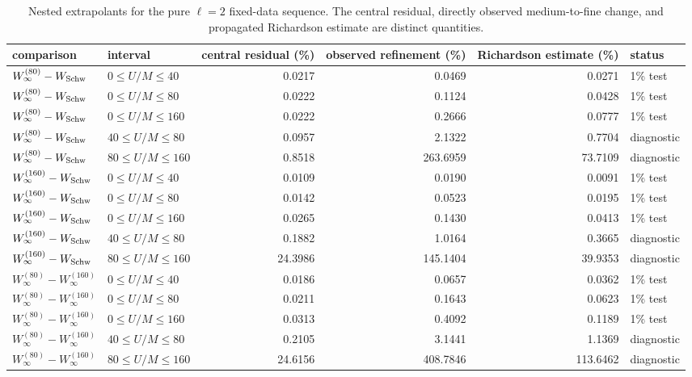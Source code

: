 \begin{table}
\centering
\small
\caption{Nested extrapolants for the pure $\ell=2$ fixed-data sequence. The central residual, directly observed medium-to-fine change, and propagated Richardson estimate are distinct quantities.}
\label{tab:flat-extrapolants}
\begin{tabular}{llrrrl}
\toprule
comparison & interval & central residual (\%) & observed refinement (\%) & Richardson estimate (\%) & status \\
\midrule
$W_\infty^{(80)}-W_{\rm Schw}$ & $0\leq U/M\leq 40$ & 0.0217 & 0.0469 & 0.0271 & 1\% test \\
$W_\infty^{(80)}-W_{\rm Schw}$ & $0\leq U/M\leq 80$ & 0.0222 & 0.1124 & 0.0428 & 1\% test \\
$W_\infty^{(80)}-W_{\rm Schw}$ & $0\leq U/M\leq 160$ & 0.0222 & 0.2666 & 0.0777 & 1\% test \\
$W_\infty^{(80)}-W_{\rm Schw}$ & $40\leq U/M\leq 80$ & 0.0957 & 2.1322 & 0.7704 & diagnostic \\
$W_\infty^{(80)}-W_{\rm Schw}$ & $80\leq U/M\leq 160$ & 0.8518 & 263.6959 & 73.7109 & diagnostic \\
$W_\infty^{(160)}-W_{\rm Schw}$ & $0\leq U/M\leq 40$ & 0.0109 & 0.0190 & 0.0091 & 1\% test \\
$W_\infty^{(160)}-W_{\rm Schw}$ & $0\leq U/M\leq 80$ & 0.0142 & 0.0523 & 0.0195 & 1\% test \\
$W_\infty^{(160)}-W_{\rm Schw}$ & $0\leq U/M\leq 160$ & 0.0265 & 0.1430 & 0.0413 & 1\% test \\
$W_\infty^{(160)}-W_{\rm Schw}$ & $40\leq U/M\leq 80$ & 0.1882 & 1.0164 & 0.3665 & diagnostic \\
$W_\infty^{(160)}-W_{\rm Schw}$ & $80\leq U/M\leq 160$ & 24.3986 & 145.1404 & 39.9353 & diagnostic \\
$W_\infty^{(80)}-W_\infty^{(160)}$ & $0\leq U/M\leq 40$ & 0.0186 & 0.0657 & 0.0362 & 1\% test \\
$W_\infty^{(80)}-W_\infty^{(160)}$ & $0\leq U/M\leq 80$ & 0.0211 & 0.1643 & 0.0623 & 1\% test \\
$W_\infty^{(80)}-W_\infty^{(160)}$ & $0\leq U/M\leq 160$ & 0.0313 & 0.4092 & 0.1189 & 1\% test \\
$W_\infty^{(80)}-W_\infty^{(160)}$ & $40\leq U/M\leq 80$ & 0.2105 & 3.1441 & 1.1369 & diagnostic \\
$W_\infty^{(80)}-W_\infty^{(160)}$ & $80\leq U/M\leq 160$ & 24.6156 & 408.7846 & 113.6462 & diagnostic \\
\bottomrule
\end{tabular}
\end{table}

